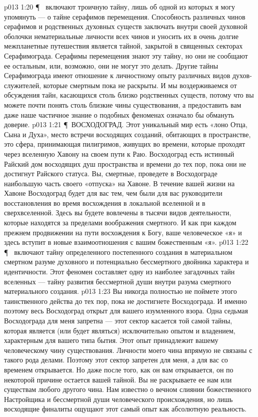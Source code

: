 \vs p013 1:20 \P\  включают троичную тайну, лишь об одной из которых я могу упомянуть --- о тайне серафимов перемещения. Способность различных чинов серафимов и родственных духовных существ заключать внутри своей духовной оболочки нематериальные личности всех чинов и уносить их в очень долгие межпланетные путешествия является тайной, закрытой в священных секторах Серафимограда. Серафимы перемещения знают эту тайну, но они не сообщают ее остальным, или, возможно, они не могут это делать. Другие тайны Серафимограда имеют отношение к личностному опыту различных видов духов\hyp{}служителей, которые смертным пока не раскрыты. И мы воздерживаемся от обсуждения тайн, касающихся столь близко родственных существ, потому что вы можете почти понять столь близкие чины существования, а предоставить вам даже наше частичное знание о подобных феноменах означало бы обмануть доверие.
\vs p013 1:21 \P\ \bibnobreakspace ВОСХОДОГРАД. Этот уникальный мир есть «лоно Отца, Сына и Духа», место встречи восходящих созданий, обитающих в пространстве, это сфера, принимающая пилигримов, живущих во времени, которые проходят через вселенную Хавону на своем пути к Раю. Восходоград есть истинный Райский дом восходящих душ пространства и времени до тех пор, пока они не достигнут Райского статуса. Вы, смертные, проведете в Восходограде наибольшую часть своего «отпуска» на Хавоне. В течение вашей жизни на Хавоне Восходоград будет для вас тем, чем были для вас руководители восстановления во время восхождения в локальной вселенной и в сверхвселенной. Здесь вы будете вовлечены в тысячи видов деятельности, которые находятся за пределами воображения смертного. И как при каждом прежнем продвижении на пути восхождения к Богу, ваше человеческое «я» и здесь вступит в новые взаимоотношения с вашим божественным «я».
\vs p013 1:22 \P\  включают тайну определенного постепенного создания в материальном смертном разуме духовного и потенциально бессмертного двойника характера и идентичности. Этот феномен составляет одну из наиболее загадочных тайн вселенных --- тайну развития бессмертной души внутри разума смертного материального создания.
\vs p013 1:23 Вы никогда полностью не поймете этого таинственного действа до тех пор, пока не достигнете Восходограда. И именно поэтому весь Восходоград открыт для вашего изумленного взора. Одна седьмая Восходограда для меня запретна --- этот сектор касается той самой тайны, которая является (или будет являться) исключительно опытом и владением, характерным для вашего типа бытия. Этот опыт принадлежит вашему человеческому чину существования. Личности моего чина впрямую не связаны с такого рода делами. Поэтому этот сектор запретен для меня, а для вас со временем открывается. Но даже после того, как он вам открывается, он по некоторой причине остается вашей тайной. Вы не раскрываете ее нам или существам любого другого чина. Нам известно о вечном слиянии божественного Настройщика и бессмертной души человеческого происхождения, но лишь восходящие финалиты ощущают этот самый опыт как абсолютную реальность.
